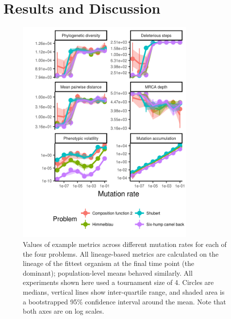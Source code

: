 \documentclass[letterpaper]{article}
\begin{document}
\section{Results and Discussion}


\begin{figure}
\includegraphics[width=3.5in]{figs/all_mutation_rate.png}
\caption{\small Values of example metrics across different mutation rates for each of the four problems. All lineage-based metrics are calculated on the lineage of the fittest organism at the final time point (the dominant); population-level means behaved similarly. All experiments shown here used a tournament size of 4. Circles are medians, vertical lines show inter-quartile range, and shaded area is a bootstrapped 95\% confidence interval around the mean. Note that both axes are on log scales.}
\label{fig:mutation_rate}
\end{figure}
\end{document}
